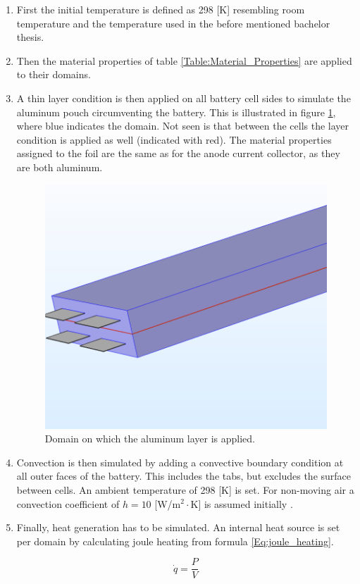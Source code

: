 \begin{enumerate}
\item First the initial temperature is defined as 298 [K] resembling room temperature and the temperature used in the before mentioned bachelor thesis. 
\item Then the material properties of table \ref{Table:Material_Properties} are applied to their domains.
\item A thin layer condition is then applied on all battery cell sides to simulate the aluminum pouch circumventing the battery. This is illustrated in figure \ref{thinlayer}, where blue indicates the domain. Not seen is that between the cells the layer condition is applied as well (indicated with red). The material properties assigned to the foil are the same as for the anode current collector, as they are both aluminum.
\begin{figure} [H]
	\centering
	\includegraphics[width=0.5\linewidth]{Figures/thinlayer.png}
	\caption{Domain on which the aluminum layer is applied.}
   \label{thinlayer}
\end{figure}
\item Convection is then simulated by adding a convective boundary condition at all outer faces of the battery. This includes the tabs, but excludes the surface between cells. An ambient temperature of 298 [K] is set. For non-moving air a convection coefficient of $h = 10$ [W/m$^2 \cdot$K] is assumed initially \cite{heat_transfer_coefficient}. 
\item Finally, heat generation has to be simulated. An internal heat source is set per domain by calculating joule heating from formula \ref{Eq:joule_heating}.

\begin{equation}
\label{Eq:joule_heating}
\dot{q} = \frac{P}{V}
\end{equation}


\end{enumerate}
